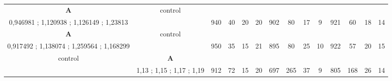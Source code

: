 \begin{table}[]
{\begin{tabular}{|c|c|c|c|c|c|c|c|c|c|c|c|c|c|}
\cellcolor{blue!15}\textbf{A} & control& {\color[HTML]{00009B} } & {\color[HTML]{9A0000} } & {\color[HTML]{009901} } &  & {\color[HTML]{00009B} } & {\color[HTML]{9A0000} } & {\color[HTML]{009901} } &  & {\color[HTML]{00009B} } & {\color[HTML]{9A0000} } & {\color[HTML]{009901} } &  \\ 
\cellcolor{ blue!15}0,946981 ; 1,120938 ; 1,126149 ; 1,23813 &  & \multirow{-2}{*}{{\color[HTML]{00009B} 940}} & \multirow{-2}{*}{{\color[HTML]{9A0000} 40}} & \multirow{-2}{*}{{\color[HTML]{009901} 20}} & \multirow{-2}{*}{20} & \multirow{-2}{*}{{\color[HTML]{00009B} 902}} & \multirow{-2}{*}{{\color[HTML]{9A0000} 80}} & \multirow{-2}{*}{{\color[HTML]{009901} 17}} & \multirow{-2}{*}{9} & \multirow{-2}{*}{{\color[HTML]{00009B} 921}} & \multirow{-2}{*}{{\color[HTML]{9A0000} 60}} & \multirow{-2}{*}{{\color[HTML]{009901} 18}} & \multirow{-2}{*}{14} \\ \hline

\cellcolor{blue!15}\textbf{A} & control& {\color[HTML]{00009B} } & {\color[HTML]{9A0000} } & {\color[HTML]{009901} } &  & {\color[HTML]{00009B} } & {\color[HTML]{9A0000} } & {\color[HTML]{009901} } &  & {\color[HTML]{00009B} } & {\color[HTML]{9A0000} } & {\color[HTML]{009901} } &  \\ 
\cellcolor{ blue!15}0,917492 ; 1,138074 ; 1,259564 ; 1,168299 &  & \multirow{-2}{*}{{\color[HTML]{00009B} 950}} & \multirow{-2}{*}{{\color[HTML]{9A0000} 35}} & \multirow{-2}{*}{{\color[HTML]{009901} 15}} & \multirow{-2}{*}{21} & \multirow{-2}{*}{{\color[HTML]{00009B} 895}} & \multirow{-2}{*}{{\color[HTML]{9A0000} 80}} & \multirow{-2}{*}{{\color[HTML]{009901} 25}} & \multirow{-2}{*}{10} & \multirow{-2}{*}{{\color[HTML]{00009B} 922}} & \multirow{-2}{*}{{\color[HTML]{9A0000} 57}} & \multirow{-2}{*}{{\color[HTML]{009901} 20}} & \multirow{-2}{*}{15} \\ \hline

control & \cellcolor{blue!15}\textbf{A}& {\color[HTML]{00009B} } & {\color[HTML]{9A0000} } & {\color[HTML]{009901} } &  & {\color[HTML]{00009B} } & {\color[HTML]{9A0000} } & {\color[HTML]{009901} } &  & {\color[HTML]{00009B} } & {\color[HTML]{9A0000} } & {\color[HTML]{009901} } &  \\ 
 & \cellcolor{ blue!15}1,13 ; 1,15 ; 1,17 ; 1,19 & \multirow{-2}{*}{{\color[HTML]{00009B} 912}} & \multirow{-2}{*}{{\color[HTML]{9A0000} 72}} & \multirow{-2}{*}{{\color[HTML]{009901} 15}} & \multirow{-2}{*}{20} & \multirow{-2}{*}{{\color[HTML]{00009B} 697}} & \multirow{-2}{*}{{\color[HTML]{9A0000} 265}} & \multirow{-2}{*}{{\color[HTML]{009901} 37}} & \multirow{-2}{*}{9} & \multirow{-2}{*}{{\color[HTML]{00009B} 805}} & \multirow{-2}{*}{{\color[HTML]{9A0000} 168}} & \multirow{-2}{*}{{\color[HTML]{009901} 26}} & \multirow{-2}{*}{14} \\ \hline


\end{tabular}}
\end{table}
